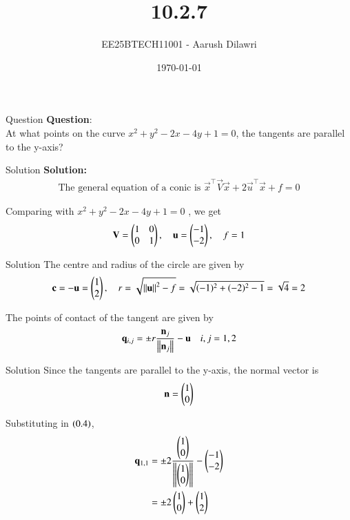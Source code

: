 \documentclass{beamer}
\title{10.2.7}
\date{\today}
\author{EE25BTECH11001 - Aarush Dilawri}
\begin{document}
\frame{\titlepage}

\begin{frame}{Question}
\textbf{Question}:\\
At what points on the curve $x^2 + y^2 - 2x - 4y + 1 = 0$, the tangents are parallel to
the y-axis?
\end{frame}

\begin{frame}{Solution}
\textbf{Solution:}\\

\begin{align}
\text{The general equation of a conic is } 
\vec{x}^\top\vec{V}\vec{x} + 2\vec{u}^\top\vec{x} + f = 0
\end{align}

Comparing with $x^2 + y^2 - 2x - 4y + 1 = 0$ , we get
\begin{align}
\mathbf{V} = \begin{pmatrix}1 & 0 \\ 0 & 1\end{pmatrix},\quad
\mathbf{u} = \begin{pmatrix}-1 \\ -2\end{pmatrix},\quad
f = 1
\end{align}
\end{frame}

\begin{frame}{Solution}
The centre and radius of the circle are given by
\begin{align}
\mathbf{c} = -\mathbf{u} = \begin{pmatrix}1 \\ 2\end{pmatrix},\quad
r = \sqrt{\left\lVert\mathbf{u}\right\rVert^2 - f} 
= \sqrt{(-1)^2 + (-2)^2 - 1} 
= \sqrt{4} = 2
\end{align}

The points of contact of the tangent are given by
\begin{align}
\mathbf{q}_{i,j} = \pm r\frac{\mathbf{n}_j}{\left\lVert\mathbf{n}_j\right\rVert} - \mathbf{u} \quad i,j = 1,2
\end{align}
\end{frame}

\begin{frame}{Solution}
Since the tangents are parallel to the y-axis, the normal vector is
\begin{align}
\mathbf{n} = \begin{pmatrix}1 \\ 0\end{pmatrix}
\end{align}

Substituting in $\left(0.4\right)$,
\begin{align}
\mathbf{q}_{1,1} 
&= \pm 2 \frac{\begin{pmatrix}1 \\ 0\end{pmatrix}}{\left\lVert\begin{pmatrix}1 \\ 0\end{pmatrix}\right\rVert} - \begin{pmatrix}-1 \\ -2\end{pmatrix}\\
&= \pm 2\begin{pmatrix}1 \\ 0\end{pmatrix} + \begin{pmatrix}1 \\ 2\end{pmatrix}
\end{align}
\end{frame}
\end{document}

